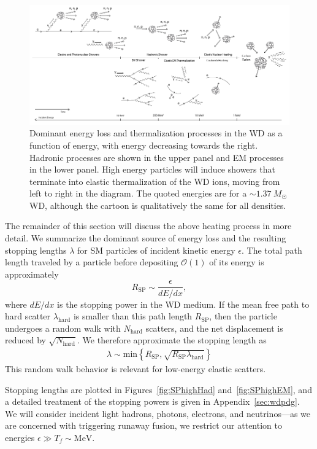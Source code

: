 \documentclass[preprintnumbers,amsmath,amssymb,prd,superscriptaddress]{revtex4}
\newcommand{\OO}{\mathcal{O}}
\begin{document}
\begin{figure}
\includegraphics[scale=1.15]{cooling-cartoon.pdf}
\caption{Dominant energy loss and thermalization processes in the WD as a function of energy, with energy decreasing towards the right.
Hadronic processes are shown in the upper panel and EM processes in the lower panel.
High energy particles will induce showers that terminate into elastic thermalization of the WD ions, moving from left to right in the diagram.
The quoted energies are for a $\sim 1.37 ~M_{\astrosun}$ WD, although the cartoon is qualitatively the same for all densities.}
\label{fig:cooling-cartoon}
\end{figure}


The remainder of this section will discuss the above heating process in more detail.
We summarize the dominant source of energy loss and the resulting stopping lengths $\lambda$ for SM particles of incident kinetic energy $\epsilon$.
The total path length traveled by a particle before depositing $\OO(1)$ of its energy is approximately
\begin{equation}
R_\text{SP} \sim \frac{\epsilon}{dE/dx},
\end{equation}
where $dE/dx$ is the stopping power in the WD medium.
If the mean free path to hard scatter $\lambda_\text{hard}$ is smaller than this path length $R_\text{SP}$, then the particle undergoes a random walk with $N_\text{hard}$ scatters, and the net displacement is reduced by $\sqrt{N_\text{hard}}$.
We therefore approximate the stopping length as
\begin{align}
\lambda \sim \text{min}\left\{ R_\text{SP}, \sqrt{R_\text{SP}\lambda_\text{hard}} \right\}
\end{align}
This random walk behavior is relevant for low-energy elastic scatters.

Stopping lengths are plotted in Figures~\ref{fig:SPhighHad} and~\ref{fig:SPhighEM}, and a detailed treatment of the stopping powers is given in Appendix~\ref{sec:wdpdg}.
We will consider incident light hadrons, photons, electrons, and neutrinos---as we are concerned with triggering runaway fusion, we restrict our attention to energies $\epsilon \gg T_f \sim \text{MeV}$.
\end{document}
